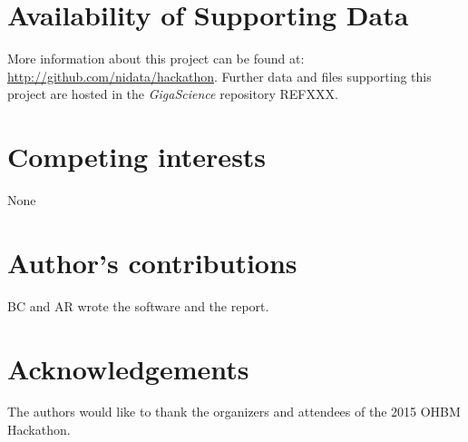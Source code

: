 \documentclass[twocolumn]{bmcart}%
\begin{document}
\begin{backmatter}

\section*{Availability of Supporting Data}
More information about this project can be found at: \url{http://github.com/nidata/hackathon}. Further data and files supporting this project are hosted in the \emph{GigaScience} repository REFXXX.

\section*{Competing interests}
None

\section*{Author's contributions}
BC and AR wrote the software and the report.

\section*{Acknowledgements}
The authors would like to thank the organizers and attendees of the 2015
OHBM Hackathon.

  
  


\end{backmatter}
\end{document}
